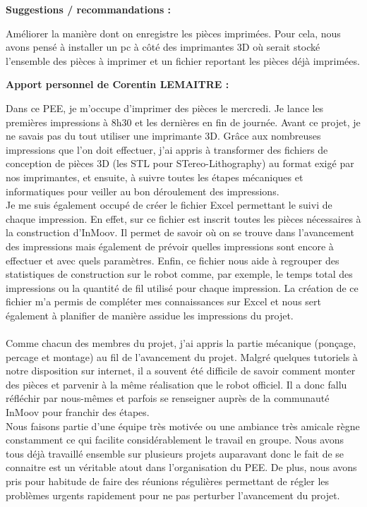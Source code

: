 \documentclass[12pt, oneside]{article}
\begin{document}
\vspace{1cm}
\textcolor{bleu}{\Large{\textbf{Suggestions / recommandations :}}}
\vspace{0.5cm}

Améliorer la manière dont on enregistre les pièces imprimées. Pour cela, nous avons pensé à installer un pc à côté des imprimantes 3D où serait stocké l'ensemble des pièces à imprimer et un fichier reportant les pièces déjà imprimées.

\vspace{1cm}
\textcolor{bleu}{\Large{\textbf{Apport personnel de Corentin LEMAITRE :}}}
\vspace{0.5cm}

Dans ce PEE, je m’occupe d’imprimer des pièces le mercredi. Je lance les premières impressions à 8h30 et les dernières en fin de journée. Avant ce projet, je ne savais pas du tout utiliser une imprimante 3D. Grâce aux nombreuses impressions que l'on doit effectuer, j'ai appris à transformer des fichiers de conception de pièces 3D (les STL pour STereo-Lithography)  au format exigé par nos imprimantes, et ensuite, à suivre toutes les étapes mécaniques et informatiques pour veiller au bon déroulement des impressions.\\
Je me suis également occupé de créer le fichier Excel permettant le suivi de chaque impression. En effet, sur ce fichier est inscrit toutes les pièces nécessaires à la construction d'InMoov. Il permet de savoir où on se trouve dans l'avancement des impressions mais également de prévoir quelles impressions sont encore à effectuer et avec quels paramètres. Enfin, ce fichier nous aide à regrouper des statistiques de construction sur le robot comme, par exemple, le temps total des impressions ou la quantité de fil utilisé pour chaque impression. La création de ce fichier m'a permis de compléter mes connaissances sur Excel et nous sert également à planifier de manière assidue les impressions du projet. 
\paragraph{}
Comme chacun des membres du projet, j'ai appris la partie mécanique (ponçage, percage et montage) au fil de l'avancement du projet. Malgré quelques tutoriels à notre disposition sur internet, il a souvent été difficile de savoir comment monter des pièces et parvenir à la même réalisation que le robot officiel. Il a donc fallu réfléchir par nous-mêmes et parfois se renseigner auprès de la communauté InMoov pour franchir des étapes. \\
Nous faisons partie d’une équipe très motivée ou une ambiance très amicale règne constamment ce qui facilite considérablement le travail en groupe. Nous avons tous déjà travaillé ensemble sur plusieurs projets auparavant donc le fait de se connaitre est un véritable atout dans l'organisation du PEE. De plus, nous avons pris pour habitude de faire des réunions régulières permettant de régler les problèmes urgents rapidement pour ne pas perturber l'avancement du projet.
\end{document}
